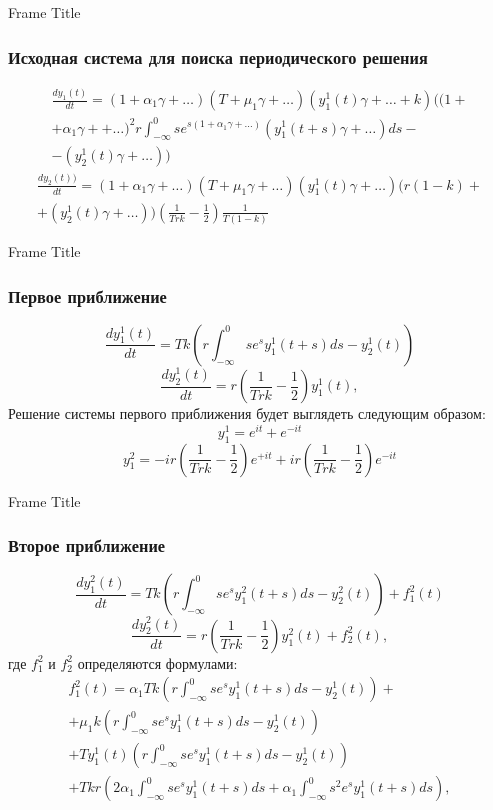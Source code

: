 \documentclass[12pt]{beamer}
\begin{document}
\begin{frame}{Frame Title}
\frametitle{Исходная система для поиска периодического решения}
     \begin{multline}
      \label{system1}
       \frac{d y_1(t)}{d t}=(1+\alpha_1 \gamma+\ldots) (T+\mu_1 \gamma+\ldots)(y_1^1(t) \gamma+\ldots+k)( (1+\\+\alpha_1 \gamma++\ldots)^2 r  \int_{-\infty}^{0} s e^{s (1+\alpha_1 \gamma + \ldots)} ( y_1^1(t+s)\gamma +\ldots)d s -\\- (y_2^1(t) \gamma+\ldots ))
  \end{multline}
  \begin{multline*}
     \frac{d y_2(t))}{d t}=(1+\alpha_1 \gamma+\ldots) (T+\mu_1 \gamma+\ldots)(y_1^1(t) \gamma + \ldots)( r(1-k) +\\+( y_2^1(t)\gamma+\ldots) )\left( \frac{1}{T r k} - \frac{1}{2}\right)\frac{1}{T(1-k)}
  \end{multline*}
\end{frame}
\begin{frame}{Frame Title}
\frametitle{Первое приближение }
   \begin{equation}\label{s1}
      \frac{d y^1_1(t)}{d t}=T k (r \int_{-\infty}^{0} s e^{s}y^1_1(t+s)d s -  y^1_2 (t) ) 
  \end{equation}
\begin{equation*}
   \frac{d y^1_2(t)}{d t}= r(\frac{1}{T r k} -\frac{1}{2})y^1_1(t) ,
\end{equation*}
 Решение системы первого приближения будет выглядеть следующим образом:
 \begin{equation*}
    y_1^1= e^{i t}+ e^{-i t}
 \end{equation*}
 \begin{equation*}
    y_1^2=-i r \left(  \frac{1}{T r k} - \frac{1}{2}\right) e^{+i t}+ i r \left(  \frac{1}{T r k} - \frac{1}{2}\right) e^{-i t}
 \end{equation*}
\end{frame}
\begin{frame}{Frame Title}
\frametitle{Второе приближение}
    \begin{equation}\label{s2}
       \frac{d y^2_1(t)}{d t}=T k (r \int_{-\infty}^{0} s e^{s}y^2_1(t+s)d s -  y^2_2 (t) ) + f^2_1 (t)
   \end{equation}
   \begin{equation*}
   \frac{d y^2_2(t)}{d t}= r(\frac{1}{T r k} -\frac{1}{2})y^2_1(t)+f^2_2 (t) ,
\end{equation*}
где $ f^2_1 $ и $f^2_2$ определяются формулами:
\begin{multline*}
    f^2_1 (t)=\alpha_1 T k \left( r \int_{-\infty}^{0} s e^{s} y^1_1 (t+s) d s - y^1_2 (t) \right)+\\+\mu_1 k \left( r \int_{-\infty}^{0} s e^{s} y^1_1 (t+s) d s - y^1_2 (t) \right)\\ +T y^1_1 (t) \left( r \int_{-\infty}^{0} s e^{s} y^1_1 (t+s) d s - y^1_2 (t) \right) \\+T k r \left(  2  \alpha_1 \int_{-\infty}^{0} s e^{s} y^1_1 (t+s)d s +  \alpha_1 \int_{-\infty}^{0}s^2 e^{s} y^1_1(t+s) d s     \right) ,
    \end{multline*}
   \end{frame}
\end{document}
